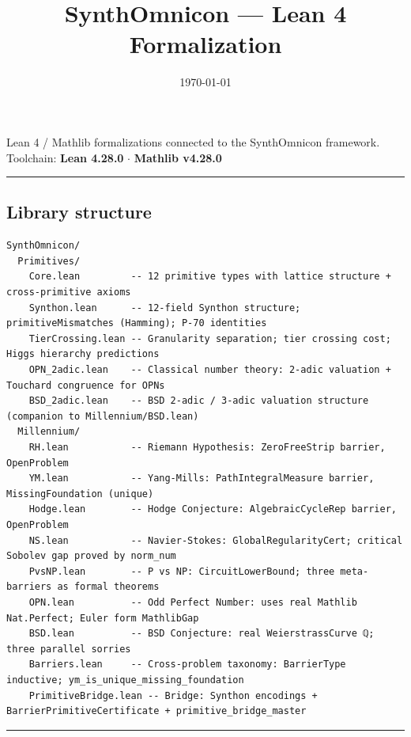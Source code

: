 \documentclass[10pt,a4paper]{article}
\begin{document}
\title{SynthOmnicon --- Lean 4 Formalization}
\date{\today}

\maketitle

Lean 4 / Mathlib formalizations connected to the SynthOmnicon framework.
Toolchain: \textbf{Lean 4.28.0} $\cdot$ \textbf{Mathlib v4.28.0}

\begin{center}
\rule{0.5\textwidth}{0.4pt}
\end{center}

\subsection{Library structure}

\begin{lstlisting}
SynthOmnicon/
  Primitives/
    Core.lean         -- 12 primitive types with lattice structure + cross-primitive axioms
    Synthon.lean      -- 12-field Synthon structure; primitiveMismatches (Hamming); P-70 identities
    TierCrossing.lean -- Granularity separation; tier crossing cost; Higgs hierarchy predictions
    OPN_2adic.lean    -- Classical number theory: 2-adic valuation + Touchard congruence for OPNs
    BSD_2adic.lean    -- BSD 2-adic / 3-adic valuation structure (companion to Millennium/BSD.lean)
  Millennium/
    RH.lean           -- Riemann Hypothesis: ZeroFreeStrip barrier, OpenProblem
    YM.lean           -- Yang-Mills: PathIntegralMeasure barrier, MissingFoundation (unique)
    Hodge.lean        -- Hodge Conjecture: AlgebraicCycleRep barrier, OpenProblem
    NS.lean           -- Navier-Stokes: GlobalRegularityCert; critical Sobolev gap proved by norm_num
    PvsNP.lean        -- P vs NP: CircuitLowerBound; three meta-barriers as formal theorems
    OPN.lean          -- Odd Perfect Number: uses real Mathlib Nat.Perfect; Euler form MathlibGap
    BSD.lean          -- BSD Conjecture: real WeierstrassCurve ℚ; three parallel sorries
    Barriers.lean     -- Cross-problem taxonomy: BarrierType inductive; ym_is_unique_missing_foundation
    PrimitiveBridge.lean -- Bridge: Synthon encodings + BarrierPrimitiveCertificate + primitive_bridge_master
\end{lstlisting}

\begin{center}
\rule{0.5\textwidth}{0.4pt}
\end{center}
\end{document}
